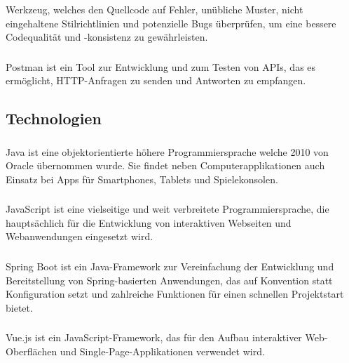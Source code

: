 \subsubsection{\textcite{lint}}
Werkzeug, welches den Quellcode auf Fehler, unübliche Muster, nicht eingehaltene Stilrichtlinien und potenzielle Bugs
überprüfen, um eine bessere Codequalität und -konsistenz zu gewährleisten.

\subsubsection{\textcite{postman}} Postman ist ein Tool zur Entwicklung und zum Testen von APIs, das es ermöglicht,
HTTP-Anfragen zu senden und Antworten zu empfangen.

\subsection{Technologien}

\subsubsection{\textcite{java}}
Java ist eine objektorientierte höhere Programmiersprache welche 2010 von Oracle übernommen wurde.
Sie findet neben Computerapplikationen auch Einsatz bei Apps für Smartphones, Tablets und Spielekonsolen.

\subsubsection{\textcite{javascript}}
JavaScript ist eine vielseitige und weit verbreitete Programmiersprache, die hauptsächlich für die Entwicklung von
interaktiven Webseiten und Webanwendungen eingesetzt wird.

\subsubsection{\textcite{spring-boot}}
Spring Boot ist ein Java-Framework zur Vereinfachung der Entwicklung und Bereitstellung von Spring-basierten
Anwendungen, das auf Konvention statt Konfiguration setzt und zahlreiche Funktionen für einen schnellen Projektstart
bietet.

\subsubsection{\textcite{vuejs}}
Vue.js ist ein JavaScript-Framework, das für den Aufbau interaktiver Web-Oberflächen und Single-Page-Applikationen verwendet wird.

